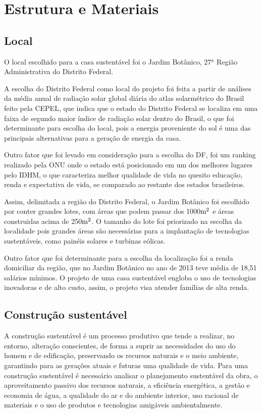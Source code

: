 \chapter{Estrutura e Materiais}

\section{Local}
	O local escolhido para a casa sustentável foi o Jardim Botânico, 27$^a$ Região Administrativa do Distrito Federal.

	A escolha do Distrito Federal como local do projeto foi feita a partir de análises da média anual de radiação solar global diária do atlas solarmétrico do Brasil feito pela CEPEL, que indica que o estado do Distrito Federal se localiza em uma faixa de segundo maior índice de radiação solar dentro do Brasil, o que foi determinante para escolha do local, pois a energia proveniente do sol é uma das principais alternativas para a geração de energia da casa.

	Outro fator que foi levado em consideração para a escolha do DF, foi um ranking realizado pela ONU onde o estado está posicionado em um dos melhores lugares pelo IDHM, o que caracteriza melhor qualidade de vida no quesito educação, renda e expectativa de vida, se comparado ao restante dos estados brasileiros.

	Assim, delimitada a região do Distrito Federal, o Jardim Botânico foi escolhido por conter grandes lotes, com áreas que podem passar dos 1000$\textup{m}^{2}$\cite{5298d86a7fd17} e áreas construidas acima de 250$\textup{m}^{2}$\cite{PDAD}. O tamanho do lote foi priorizado na escolha da localidade pois grandes áreas são necessárias para a implantação de tecnologias sustentáveis, como painéis solares e turbinas eólicas. 

	Outro fator que foi determinante para a escolha da localização foi a renda domiciliar da região, que no Jardim Botânico no ano de 2013 teve média de 18,51 salários mínimos\cite{pesquisa_socioeconomica}. O projeto de uma casa sustentável engloba o uso de tecnologias inovadoras e de alto custo, assim, o projeto visa atender famílias de alta renda.

\section{Construção sustentável}

	A construção sustentável é um processo produtivo que tende a realizar, no entorno, alteração conscientes, de forma a suprir as necessidades do uso do homem e de edificação, preservando os recursos naturais e o meio ambiente, garantindo para as gerações atuais e futuras uma qualidade de vida.\cite{Baroni1992} Para uma construção sustentável é necessário analisar o planejamento sustentável da obra, o aproveitamento passivo dos recursos naturais, a eficiência energética, a gestão e economia de água, a qualidade do ar e do ambiente interior, uso racional de materiais e o uso de produtos e tecnologias amigáveis ambientalmente.\cite{Araujo2012}

